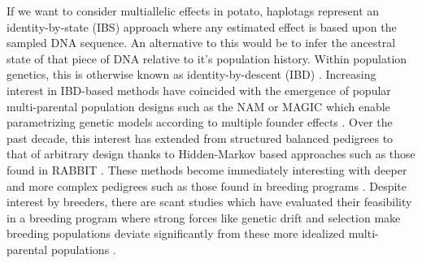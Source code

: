 If we want to consider multiallelic effects in potato, haplotags
represent an identity-by-state (IBS) approach where any estimated effect
is based upon the sampled DNA sequence. An alternative to this would be
to infer the ancestral state of that piece of DNA relative to it's
population history. Within population genetics, this is otherwise known as
identity-by-descent (IBD) \autocite{Falconer1996}. Increasing interest
in IBD-based methods have coincided with the emergence of popular
multi-parental population designs such as the NAM or MAGIC which enable
parametrizing genetic models according to multiple founder effects
\autocite{Li2021,Garin2021}. Over the past decade, this interest has
extended from structured balanced pedigrees to that of arbitrary design
thanks to Hidden-Markov based approaches such as those found in RABBIT
\autocite{Zheng2015}. These methods become immediately interesting with
deeper and more complex pedigrees such as those found in breeding
programs \autocite{Tisne2015,VanEeuwijk2010}. Despite interest by
breeders, there are scant studies which have evaluated their feasibility
in a breeding program where strong forces like genetic drift and
selection make breeding populations deviate significantly from these
more idealized multi-parental populations \autocite{Hill2014, Garin2021}.

